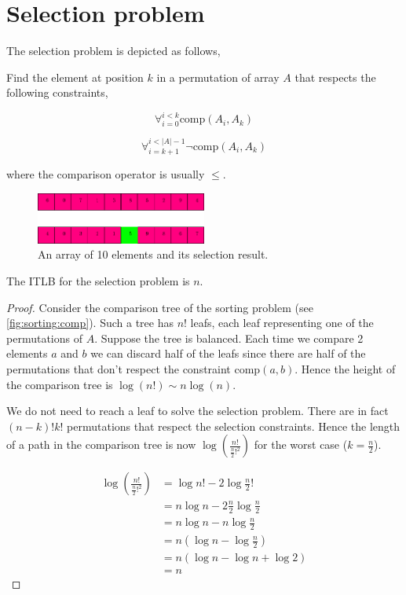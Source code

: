 \chapter{Selection problem}
\label{tree:S}

The selection problem is depicted as follows,

Find the element at position $k$ in a permutation of array $A$ that respects the following constraints,

\begin{equation}
\forall_{i = 0}^{i < k} \text{comp}(A_i, A_k)
\end{equation}

\begin{equation}
\forall_{i = k + 1}^{i < |A| - 1} \neg\text{comp}(A_i, A_k)
\end{equation}

where the comparison operator is usually $\leq$.\\


\begin{figure}
	\centering
	\includegraphics[width=0.5\textwidth]{fig/selection:array}
	\caption{\label{fig:selection:array} An array of 10 elements and its selection result.}
\end{figure}


\begin{theorem}
The ITLB for the selection problem is $n$.
\end{theorem}

\begin{proof}
Consider the comparison tree of the sorting problem (see \ref{fig:sorting:comp}).
Such a tree has $n!$ leafs, each leaf representing one of the permutations of $A$.
Suppose the tree is balanced.
Each time we compare 2 elements $a$ and $b$ we can discard half of the leafs since there are half of the permutations that don't respect the constraint $\text{comp}(a, b)$.
Hence the height of the comparison tree is $\log(n!) \sim n \log(n)$.

We do not need to reach a leaf to solve the selection problem.
There are in fact $(n-k)!k!$ permutations that respect the selection constraints.
Hence the length of a path in the comparison tree is now $\log(\frac{n!}{\frac{n}{2}!^2})$
for the worst case ($k = \frac{n}{2}$).

\begin{align*}
\log(\frac{n!}{\frac{n}{2}!^2})	&= \log n! - 2 \log \frac{n}{2}! \\
								&= n \log n - 2\frac{n}{2} \log \frac{n}{2} \\
								&= n \log n - n \log \frac{n}{2} \\
								&= n(\log n - \log \frac{n}{2}) \\
								&= n(\log n - \log n + \log 2) \\
								&= n
\end{align*}
\end{proof}

